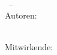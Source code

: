 {{{{{                    \begin{minipage}[t]{0.89\columnwidth}
                        \raggedright%
                        \normalfont\Huge\bfseries\title{}\\[1mm]
                        \normalfont\Large\semester\ --\ \dozent{}\\
                        \large Autoren:\ \author{}\\
                            \ifdefined\contributors
                                \normalsize\large Mitwirkende:\ \contributors{}\\[1mm]
                            \else
                                \myul{\url{\repo}}
                            \fi
                    \end{minipage}\par
                    \ifdefined\contributors
                        \small\myul{\url{\repo}}
                    \fi
}}}}}
